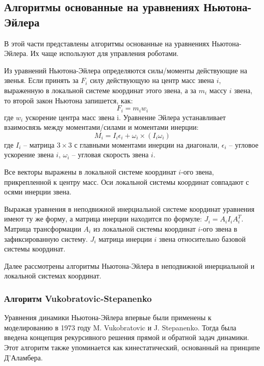 \subsection{Алгоритмы основанные на уравнениях Ньютона-Эйлера}

В этой части представлены алгоритмы основанные на уравнениях Ньютона-Эйлера. Их чаще используют для управления роботами.

Из уравнений Ньютона-Эйлера определяются силы/моменты действующие на звенья. Если принять за $F_i$ силу действующую на центр масс звена $i$, выраженную в локальной системе координат этого звена, а за $m_i$ массу $i$ звена, то второй закон Ньютона запишется, как:
\begin{equation}
F_i = m_i w_i
\end{equation}
где $w_i$ ускорение центра масс звена i. Уравнение Эйлера устанавливает взаимосвязь между моментами/силами и моментами инерции:
\begin{equation}
M_i = I_i \epsilon_i + \omega_i \times (I_i \omega_i)
\end{equation}
где $I_i$ -- матрица $3 \times 3$ с главными моментами инерции на диагонали,
$\epsilon_i$ -- угловое ускорение звена $i$, $\omega_i$ -- угловая скорость звена $i$.

Все векторы выражены в локальной системе координат $i$-ого звена, прикрепленной к центру масс. Оси локальной системы координат совпадают с осями инерции звена.

Выражая уравнения в неподвижной инерциальной системе координат уравнения имеют ту же форму, а матрица инерции находится по формуле: $J_i = A_i I_i A_i^T$. Матрица трансформации $A_i$ из локальной системы координат $i$-ого звена в зафиксированную систему. $J_i$ матрица инерции $i$ звена относительно базовой системы координат.

Далее рассмотрены алгоритмы Ньютона-Эйлера в неподвижной инерциальной и локальной системах координат.

\subsubsection{Алгоритм Vukobratovic-Stepanenko}

Уравнения динамики Ньютона-Эйлера впервые были применены к моделированию в 1973 году M. Vukobratovic и J. Stepanenko. Тогда была введена концепция рекурсивного решения прямой и обратной задач динамики. Этот алгоритм также упоминается как кинестатический, основанный на принципе Д'Аламбера. 

